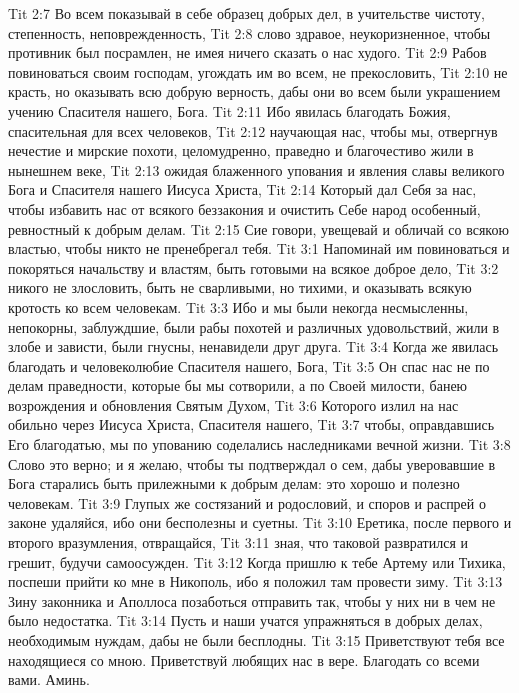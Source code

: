 \vs Tit 2:7 Во всем показывай в себе образец добрых дел, в учительстве чистоту, степенность, неповрежденность,
\vs Tit 2:8 слово здравое, неукоризненное, чтобы противник был посрамлен, не имея ничего сказать о нас худого.
\vs Tit 2:9 Рабов  повиноваться своим господам, угождать им во всем, не прекословить,
\vs Tit 2:10 не красть, но оказывать всю добрую верность, дабы они во всем были украшением учению Спасителя нашего, Бога.
\vs Tit 2:11 Ибо явилась благодать Божия, спасительная для всех человеков,
\vs Tit 2:12 научающая нас, чтобы мы, отвергнув нечестие и мирские похоти, целомудренно, праведно и благочестиво жили в нынешнем веке,
\vs Tit 2:13 ожидая блаженного упования и явления славы великого Бога и Спасителя нашего Иисуса Христа,
\vs Tit 2:14 Который дал Себя за нас, чтобы избавить нас от всякого беззакония и очистить Себе народ особенный, ревностный к добрым делам.
\rsbpar\vs Tit 2:15 Сие говори, увещевай и обличай со всякою властью, чтобы никто не пренебрегал тебя.
\vs Tit 3:1 Напоминай им повиноваться и покоряться начальству и властям, быть готовыми на всякое доброе дело,
\vs Tit 3:2 никого не злословить, быть не сварливыми, но тихими, и оказывать всякую кротость ко всем человекам.
\vs Tit 3:3 Ибо и мы были некогда несмысленны, непокорны, заблуждшие, были рабы похотей и различных удовольствий, жили в злобе и зависти, были гнусны, ненавидели друг друга.
\vs Tit 3:4 Когда же явилась благодать и человеколюбие Спасителя нашего, Бога,
\vs Tit 3:5 Он спас нас не по делам праведности, которые бы мы сотворили, а по Своей милости, банею возрождения и обновления Святым Духом,
\vs Tit 3:6 Которого излил на нас обильно через Иисуса Христа, Спасителя нашего,
\vs Tit 3:7 чтобы, оправдавшись Его благодатью, мы по упованию соделались наследниками вечной жизни.
\vs Tit 3:8 Слово это верно; и я желаю, чтобы ты подтверждал о сем, дабы уверовавшие в Бога старались быть прилежными к добрым делам: это хорошо и полезно человекам.
\vs Tit 3:9 Глупых же состязаний и родословий, и споров и распрей о законе удаляйся, ибо они бесполезны и суетны.
\vs Tit 3:10 Еретика, после первого и второго вразумления, отвращайся,
\vs Tit 3:11 зная, что таковой развратился и грешит, будучи самоосужден.
\rsbpar\vs Tit 3:12 Когда пришлю к тебе Артему или Тихика, поспеши прийти ко мне в Никополь, ибо я положил там провести зиму.
\vs Tit 3:13 Зину законника и Аполлоса позаботься отправить так, чтобы у них ни в чем не было недостатка.
\vs Tit 3:14 Пусть и наши учатся упражняться в добрых делах,  необходимым нуждам, дабы не были бесплодны.
\rsbpar\vs Tit 3:15 Приветствуют тебя все находящиеся со мною. Приветствуй любящих нас в вере. Благодать со всеми вами. Аминь.
